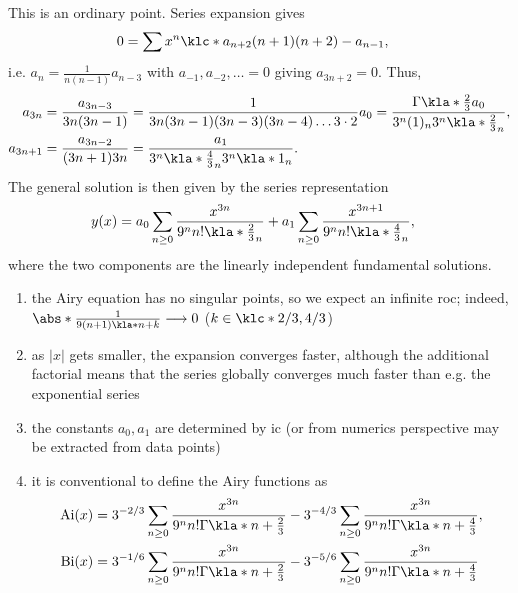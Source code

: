 \documentclass[english, parskip=full]{scrbook}
\newcommand{\note}[1]{\begin{tcolorbox}[colback=colorbackgroundnote,colframe=colornote, breakable,enhanced]#1\end{tcolorbox}}
\newcommand{\example}[3]{\begin{tcolorbox}[colback=colorbackgroundexample,colframe=colorexample, breakable,enhanced,title={\textbf{#1}: #2.}]#3\end{tcolorbox}}
\begin{document}
\example{Airy equation}{$y''=xy$ near $x=0$}{This is an ordinary point.
Series expansion gives
\begin{align}
0 &= \sum x^n \klc*{a_{n+2}(n+1)(n+2)-a_{n-1}},
\end{align}
i.e. $a_n = \frac{1}{n(n-1)}a_{n-3}$ with $a_{-1},a_{-2},\dots=0$ giving $a_{3n+2}=0$.
Thus,
\begin{align}
a_{3n} &= \frac{a_{3n-3}}{3n(3n-1)} = \frac{1}{3n(3n-1) (3n-3)(3n-4) \dots 3\cdot 2} a_0 = \frac{\Gamma\kla*{\frac{2}{3}}a_0}{3^n (1)_n 3^n \kla*{\frac{2}{3}}_n},\\
a_{3n+1} &= \frac{a_{3n-2}}{(3n+1)3n} = \frac{a_1}{3^n \kla*{\frac{4}{3}}_n 3^n \kla*{1}_n}.
\end{align}
The general solution is then given by the series representation
\begin{align}
y(x) &= a_0 \sum_{n\ge 0} \frac{x^{3n}}{9^n n! \kla*{\frac{2}{3}}_n} + a_1 \sum_{n\ge 0} \frac{x^{3n+1}}{9^n n! \kla*{\frac{4}{3}}_n},
\end{align}
where the two components are the linearly independent fundamental solutions.
\note{ \begin{enumerate}
\item the Airy equation has no singular points, so we expect an infinite \gls{roc}; indeed, $\abs*{\frac{1}{9(n+1) \kla*{n+k}}} \longrightarrow 0$ ($k\in\klc*{2/3, 4/3}$)
\item as $|x|$ gets smaller, the expansion converges faster, although the additional factorial means that the series globally converges much faster than e.g. the exponential series
\item the constants $a_0,a_1$ are determined by \gls{ic} (or from numerics perspective may be extracted from data points)
\item it is conventional to define the Airy functions as 
\begin{align}
\text{Ai}(x) &= 3^{-2/3} \sum_{n\ge 0} \frac{x^{3n}}{9^n n! \Gamma\kla*{n+\frac{2}{3}}} - 3^{-4/3} \sum_{n\ge 0} \frac{x^{3n}}{9^n n! \Gamma\kla*{n+\frac{4}{3}}},\\
\text{Bi}(x) &= 3^{-1/6} \sum_{n\ge 0} \frac{x^{3n}}{9^n n! \Gamma\kla*{n+\frac{2}{3}}} - 3^{-5/6} \sum_{n\ge 0} \frac{x^{3n}}{9^n n! \Gamma\kla*{n+\frac{4}{3}}}
\end{align}
\end{enumerate}
}
}
\end{document}

